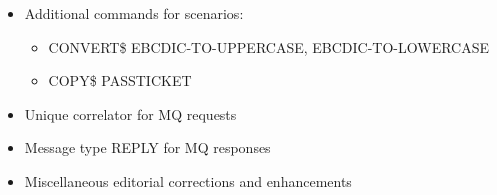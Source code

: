 \documentclass[letterpaper,10pt,english]{sphinxmanual}
\begin{document}
\begin{itemize}
\item {} 
Additional commands for scenarios:
\begin{itemize}
\item {} 
CONVERT\$ EBCDIC-TO-UPPERCASE, EBCDIC-TO-LOWERCASE

\item {} 
COPY\$ PASSTICKET

\end{itemize}

\end{itemize}

\begin{itemize}
\item {} 
Unique correlator for MQ requests

\item {} 
Message type REPLY for MQ responses

\end{itemize}

\begin{itemize}
\item {} 
Miscellaneous editorial corrections and enhancements

\end{itemize}
\end{document}
